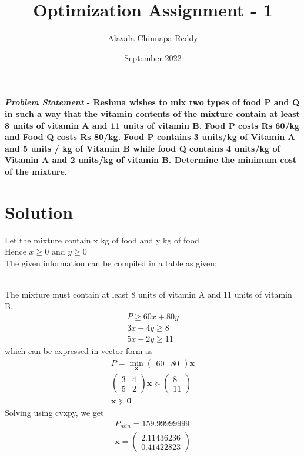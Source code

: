 \documentclass[journal,10pt,twocolumn]{article}
\title{\textbf{Optimization Assignment - 1}}
\author{Alavala Chinnapa Reddy}
\date{September 2022}
\let\vec\mathbf
\newcommand{\myvec}[1]{\ensuremath{\begin{pmatrix}#1\end{pmatrix}}}
\begin{document}
\maketitle
\paragraph{\textit{Problem Statement} - Reshma wishes to mix two types of food P and Q in such a way that the vitamin contents of the mixture contain at least 8 units of vitamin A and 11 units of vitamin B. Food P costs Rs 60/kg and Food Q costs Rs 80/kg. Food P contains 3 units/kg of Vitamin A and 5 units / kg of Vitamin B while food Q contains 4 units/kg of Vitamin A and 2 units/kg of vitamin B. Determine the minimum cost of the mixture.} 
\section*{\large Solution}
Let the  mixture contain x kg of food and y kg of food \\
Hence $x\geq0$ and $y\geq0$ \\
The given information can be compiled in a table as given:
\begin{table}[htb]
\tiny
{}
	\caption{DATA}
\end{table}\\
The mixture must contain at least 8 units of vitamin A and 11 units of vitamin B.
\begin{align}
	P \geq 60x+80y\\
	3x + 4y \geq 8\\
	5x + 2y \geq 11
\end{align}
which can be expressed in vector form as
\begin{align}
	P = \min_{\vec{x}}\myvec{60&80}\vec{x}\\
	\myvec{3&4\\5&2}\vec{x} \succeq \myvec{8\\11}\\
	\vec{x} \succeq \vec{0}
\end{align}
Solving using cvxpy, we get
\begin{align}
	P_{min} = 159.99999999\\
	\vec{x} = \myvec{ 2.11436236 \\ 0.41422823}
\end{align}
\end{document}
